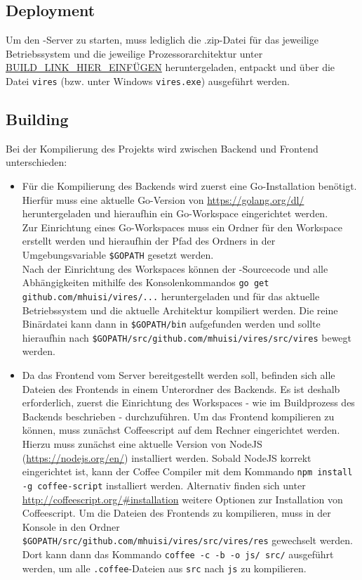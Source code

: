 \subsection{Deployment}
Um den \vires-Server zu starten, muss lediglich die .zip-Datei für das jeweilige Betriebssystem und die jeweilige Prozessorarchitektur unter 
\url{BUILD_LINK_HIER_EINFÜGEN} heruntergeladen, entpackt und über die Datei \verb+vires+ (bzw. unter Windows \verb+vires.exe+) ausgeführt werden.

\subsection{Building}
Bei der Kompilierung des Projekts wird zwischen Backend und Frontend unterschieden:
\begin{itemize}
	\item Für die Kompilierung des Backends wird zuerst eine Go-Installation benötigt.\\
	Hierfür muss eine aktuelle Go-Version von \url{https://golang.org/dl/} heruntergeladen und hieraufhin ein Go-Workspace eingerichtet werden.\\
	Zur Einrichtung eines Go-Workspaces muss ein Ordner für den Workspace erstellt werden und hieraufhin der Pfad des Ordners in der Umgebungsvariable 
	\verb+$GOPATH+ gesetzt werden.\\
	Nach der Einrichtung des Workspaces können der \vires-Sourcecode und alle Abhängigkeiten mithilfe des Konsolenkommandos
	\verb+go get github.com/mhuisi/vires/...+ heruntergeladen und für das aktuelle Betriebssystem und die aktuelle Architektur kompiliert werden. 
	Die reine Binärdatei kann dann in \verb+$GOPATH/bin+ aufgefunden werden und sollte hieraufhin nach
	\verb+$GOPATH/src/github.com/mhuisi/vires/src/vires+ bewegt werden.
	\item Da das Frontend vom Server bereitgestellt werden soll, befinden sich alle Dateien des Frontends in einem Unterordner des Backends. Es ist deshalb erforderlich, zuerst die Einrichtung des Workspaces - wie im Buildprozess des Backends beschrieben - durchzuführen.
	Um das Frontend kompilieren zu können, muss zunächst Coffeescript auf dem Rechner eingerichtet werden. Hierzu muss zunächst eine aktuelle Version von NodeJS (\url{https://nodejs.org/en/}) installiert werden. Sobald NodeJS korrekt eingerichtet ist, kann der Coffee Compiler mit dem Kommando \verb+npm install -g coffee-script+ installiert werden. Alternativ finden sich unter \url{http://coffeescript.org/\#installation} weitere Optionen zur Installation von Coffeescript.
	Um die Dateien des Frontends zu kompilieren, muss in der Konsole in den Ordner \verb+$GOPATH/src/github.com/mhuisi/vires/src/vires/res+ gewechselt werden. Dort kann dann das Kommando \verb+coffee -c -b -o js/ src/+ ausgeführt werden, um alle \verb+.coffee+-Dateien aus \verb+src+ nach \verb+js+ zu kompilieren.
\end{itemize}